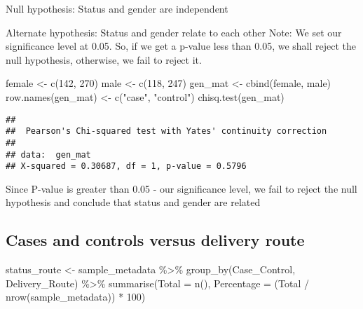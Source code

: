 \documentclass[
]{article}
\newenvironment{Shaded}{\begin{snugshade}}{\end{snugshade}}
\newcommand{\AttributeTok}[1]{\textcolor[rgb]{0.77,0.63,0.00}{#1}}
\newcommand{\DecValTok}[1]{\textcolor[rgb]{0.00,0.00,0.81}{#1}}
\newcommand{\FunctionTok}[1]{\textcolor[rgb]{0.00,0.00,0.00}{#1}}
\newcommand{\NormalTok}[1]{#1}
\newcommand{\OtherTok}[1]{\textcolor[rgb]{0.56,0.35,0.01}{#1}}
\newcommand{\SpecialCharTok}[1]{\textcolor[rgb]{0.00,0.00,0.00}{#1}}
\newcommand{\StringTok}[1]{\textcolor[rgb]{0.31,0.60,0.02}{#1}}
\begin{document}
Null hypothesis: Status and gender are independent

Alternate hypothesis: Status and gender relate to each other Note: We
set our significance level at 0.05. So, if we get a p-value less than
0.05, we shall reject the null hypothesis, otherwise, we fail to reject
it.

\begin{Shaded}
\begin{Highlighting}[]
\NormalTok{female }\OtherTok{\textless{}{-}} \FunctionTok{c}\NormalTok{(}\DecValTok{142}\NormalTok{, }\DecValTok{270}\NormalTok{)}
\NormalTok{male }\OtherTok{\textless{}{-}} \FunctionTok{c}\NormalTok{(}\DecValTok{118}\NormalTok{, }\DecValTok{247}\NormalTok{)}
\NormalTok{gen\_mat }\OtherTok{\textless{}{-}} \FunctionTok{cbind}\NormalTok{(female, male)}
\FunctionTok{row.names}\NormalTok{(gen\_mat) }\OtherTok{\textless{}{-}} \FunctionTok{c}\NormalTok{(}\StringTok{"case"}\NormalTok{, }\StringTok{"control"}\NormalTok{)}
\FunctionTok{chisq.test}\NormalTok{(gen\_mat)}
\end{Highlighting}
\end{Shaded}

\begin{verbatim}
## 
##  Pearson's Chi-squared test with Yates' continuity correction
## 
## data:  gen_mat
## X-squared = 0.30687, df = 1, p-value = 0.5796
\end{verbatim}

Since P-value is greater than 0.05 - our significance level, we fail to
reject the null hypothesis and conclude that status and gender are
related

\hypertarget{cases-and-controls-versus-delivery-route}{%
\subsection{Cases and controls versus delivery
route}\label{cases-and-controls-versus-delivery-route}}

\begin{Shaded}
\begin{Highlighting}[]
\NormalTok{status\_route }\OtherTok{\textless{}{-}}\NormalTok{ sample\_metadata }\SpecialCharTok{\%\textgreater{}\%} 
  \FunctionTok{group\_by}\NormalTok{(Case\_Control, Delivery\_Route) }\SpecialCharTok{\%\textgreater{}\%} 
  \FunctionTok{summarise}\NormalTok{(}\AttributeTok{Total =} \FunctionTok{n}\NormalTok{(), }\AttributeTok{Percentage =}\NormalTok{ (Total }\SpecialCharTok{/} \FunctionTok{nrow}\NormalTok{(sample\_metadata)) }\SpecialCharTok{*} \DecValTok{100}\NormalTok{)}
\end{Highlighting}
\end{Shaded}
\end{document}
